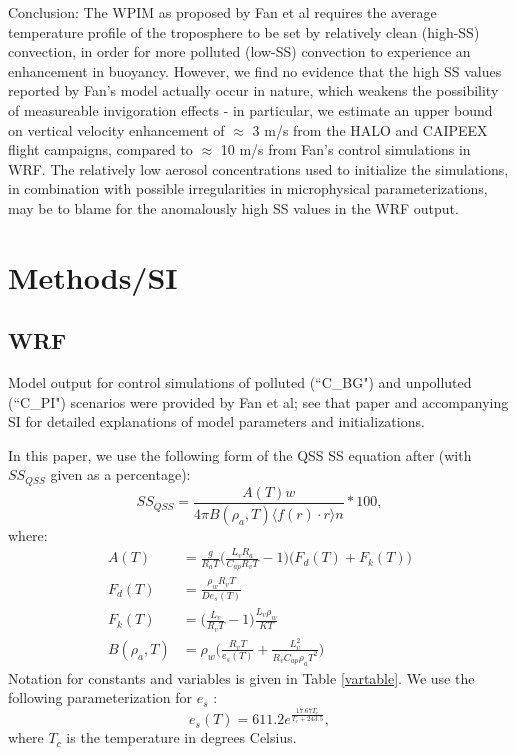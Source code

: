 \documentclass{article}
\begin{document}
Conclusion: The WPIM as proposed by Fan et al requires the average temperature profile of the troposphere to be set by relatively clean (high-SS) convection, in order for more polluted (low-SS) convection to experience an enhancement in buoyancy. However, we find no evidence that the high SS values reported by Fan's model actually occur in nature, which weakens the possibility of measureable invigoration effects - in particular, we estimate an upper bound on vertical velocity enhancement of $\approx$ 3 m/s from the HALO and CAIPEEX flight campaigns, compared to $\approx$ 10 m/s from Fan's control simulations in WRF. The relatively low aerosol concentrations used to initialize the simulations, in combination with possible irregularities in microphysical parameterizations, may be to blame for the anomalously high SS values in the WRF output.

\clearpage
\newpage

\section{Methods/SI}

\subsection{WRF}

Model output for control simulations of polluted (``C\_BG") and unpolluted (``C\_PI") scenarios were provided by Fan et al; see that paper and accompanying SI for detailed explanations of model parameters and initializations.

In this paper, we use the following form of the QSS SS equation after \cite{Rogers1989} (with $SS_{QSS}$ given as a percentage):
\begin{equation}
\label{fullss}
SS_{QSS} = \frac{A(T) w}{4\pi B(\rho_a, T) \langle f(r)\cdot r\rangle n}*100,
\end{equation}
where:
\begin{align}
A(T) &= \frac{g}{R_a T}\Big(\frac{L_v R_a}{C_{ap} R_v T} - 1\Big)\big(F_d(T) + F_k(T)\big)\nonumber\\
F_d(T) &= \frac{\rho_w R_v T}{D e_s(T)}\nonumber\\
F_k(T) &= \Big(\frac{L_v}{R_v T} - 1\Big)\frac{L_v \rho_w}{K T}\nonumber\\
B(\rho_a, T) &= \rho_w\Big(\frac{R_v T}{e_s(T)} + \frac{L_v^2}{R_v C_{ap} \rho_a T^2}\Big)
\end{align}
Notation for constants and variables is given in Table \ref{vartable}. We use the following parameterization for $e_s$ \cite{Rogers1989}:
\begin{equation}
e_s(T) = 611.2e^{\frac{17.67T_c}{T_c + 243.5}},
\end{equation}
where $T_c$ is the temperature in degrees Celsius.
\end{document}
